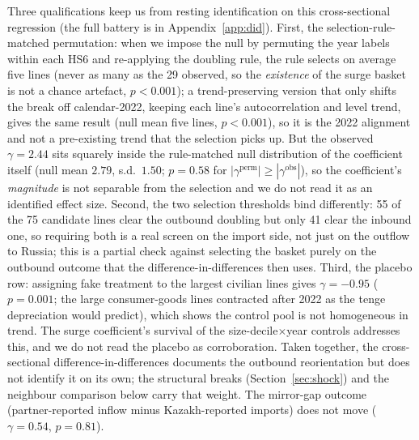 \documentclass[12pt]{article}
\begin{document}
Three qualifications keep us from resting identification on this cross-sectional
regression (the full battery is in Appendix~\ref{app:did}). First, the selection-rule-matched
permutation: when we impose the null by permuting
the year labels within each HS6 and re-applying the doubling rule, the rule selects on average
five lines (never as many as the 29 observed, so the \emph{existence} of the surge basket is
not a chance artefact, $p < 0.001$); a trend-preserving version that only shifts the break off
calendar-2022, keeping each line's autocorrelation and level trend, gives the same result
(null mean five lines, $p < 0.001$), so it is the 2022 alignment and not a pre-existing trend
that the selection picks up. But the observed $\gamma = 2.44$ sits squarely inside the
rule-matched null distribution of the coefficient itself (null mean $2.79$, s.d.\ $1.50$;
$p = 0.58$ for $|\gamma^{\text{perm}}| \ge |\gamma^{\text{obs}}|$), so the coefficient's
\emph{magnitude} is not separable from the selection and we do not read it as an identified
effect size. Second, the two
selection thresholds bind differently: 55 of the 75 candidate lines clear the outbound
doubling but only 41 clear the inbound one, so requiring both is a real screen on the import
side, not just on the outflow to Russia; this is a partial check against selecting the basket
purely on the outbound outcome that the difference-in-differences then uses. Third, the placebo row:
assigning fake treatment to the largest civilian lines gives $\gamma = -0.95$ ($p = 0.001$;
the large consumer-goods lines contracted after 2022 as the tenge depreciation would predict),
which shows the control pool is not homogeneous in trend. The surge coefficient's survival
of the size-decile$\times$year controls addresses this, and we do not read the placebo as
corroboration. Taken together, the cross-sectional difference-in-differences documents the
outbound reorientation but does not identify it on its own; the structural breaks
(Section~\ref{sec:shock}) and the neighbour comparison below carry that weight. The mirror-gap
outcome (partner-reported inflow minus Kazakh-reported imports) does not move
($\gamma = 0.54$, $p = 0.81$).
\end{document}
